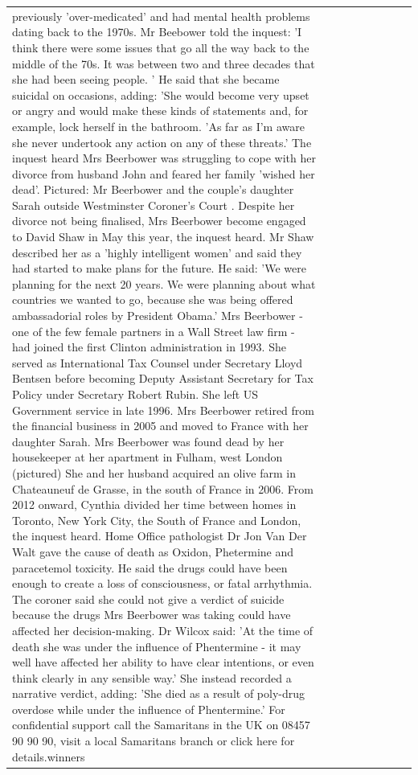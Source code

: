 \begin{table}[H]
\begin{tabular}{lllrlllll}
previously 'over-medicated' and had mental health problems dating back to the 1970s. Mr Beebower told the inquest: 'I think there were some issues that go all the way back to the middle of the 70s. It was between two and three decades that she had been seeing people. ' He said that she became suicidal on occasions, adding: 'She would become very upset or angry and would make these kinds of statements and, for example, lock herself in the bathroom. 'As far as I'm aware she never undertook any action on any of these threats.' The inquest heard Mrs Beerbower was struggling to cope with her divorce from husband John and feared her family 'wished her dead'. Pictured: Mr Beerbower and the couple's daughter Sarah outside Westminster Coroner's Court . Despite her divorce not being finalised, Mrs Beerbower become engaged to David Shaw in May this year, the inquest heard. Mr Shaw described her as a 'highly intelligent women' and said they had started to make plans for the future. He said: 'We were planning for the next 20 years. We were planning about what countries we wanted to go, because she was being offered ambassadorial roles by President Obama.' Mrs Beerbower - one of the few female partners in a Wall Street law firm - had joined the first Clinton administration in 1993. She served as International Tax Counsel under Secretary Lloyd Bentsen before becoming Deputy Assistant Secretary for Tax Policy under Secretary Robert Rubin. She left US Government service in late 1996. Mrs Beerbower retired from the financial business in 2005 and moved to France with her daughter Sarah. Mrs Beerbower was found dead by her housekeeper at her apartment in Fulham, west London (pictured) She and her husband acquired an olive farm in Chateauneuf de Grasse, in the south of France in 2006. From 2012 onward, Cynthia divided her time between homes in Toronto, New York City, the South of France and London, the inquest heard. Home Office pathologist Dr Jon Van Der Walt gave the cause of death as Oxidon, Phetermine and paracetemol toxicity. He said the drugs could have been enough to create a loss of consciousness, or fatal arrhythmia. The coroner said she could not give a verdict of suicide because the drugs Mrs Beerbower was taking could have affected her decision-making. Dr Wilcox said: 'At the time of death she was under the influence of Phentermine - it may well have affected her ability to have clear intentions, or even think clearly in any sensible way.' She instead recorded a narrative verdict, adding: 'She died as a result of poly-drug overdose while under the influence of Phentermine.' For confidential support call the Samaritans in the UK on 08457 90 90 90, visit a local Samaritans branch or click here for details.winners \\

\end{tabular}
\end{table}

